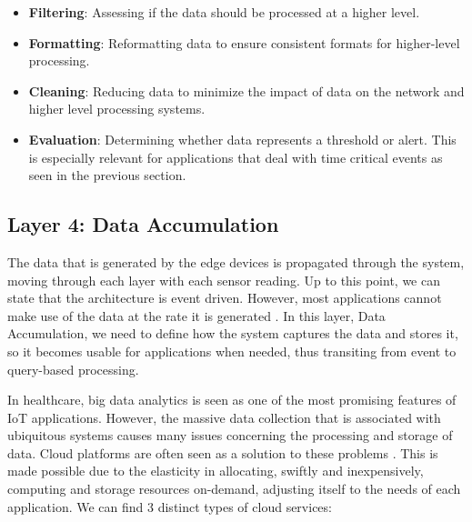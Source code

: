 \begin{itemize}
    \item \textbf{Filtering}: Assessing if the data should be processed at a higher level. 
    \item \textbf{Formatting}: Reformatting data to ensure consistent formats for higher-level processing.
    \item \textbf{Cleaning}: Reducing data to minimize the impact of data on the network and higher level processing systems.
    \item \textbf{Evaluation}: Determining whether data represents a threshold or alert. This is especially relevant for applications that deal with time critical events as seen in the previous section.
\end{itemize}

\subsection{Layer 4: Data Accumulation}
\label{sec:iot-model-layer4}


The data that is generated by the edge devices is propagated through the system, moving through each layer with each sensor reading. Up to this point, we can state that the architecture is event driven. However, most applications cannot make use of the data at the rate it is generated \cite{10.5555/3161403}. In this layer, Data Accumulation, we need to define how the system captures the data and stores it, so it becomes usable for applications when needed, thus transiting from event to query-based processing. 



In healthcare, big data analytics is seen as one of the most promising features of \acs{IoT} applications. However, the massive data collection that is associated with ubiquitous systems causes many issues concerning the processing and storage of data. Cloud platforms are often seen as a solution to these problems \cite{Baker2017}. This is made possible due to the elasticity in allocating, swiftly and inexpensively, computing and storage resources on-demand, adjusting itself to the needs of each application. We can find 3 distinct types of cloud services: %

